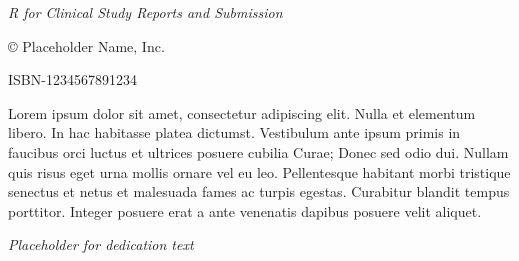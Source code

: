 \null\vfill
\begin{flushleft}
\thispagestyle{empty}
\textit{R for Clinical Study Reports and Submission}

© Placeholder Name, Inc.

ISBN-1234567891234

\noindent Lorem ipsum dolor sit amet, consectetur adipiscing elit.
Nulla et elementum libero. In hac habitasse platea dictumst.
Vestibulum ante ipsum primis in faucibus orci luctus et ultrices
posuere cubilia Curae; Donec sed odio dui. Nullam quis risus eget
urna mollis ornare vel eu leo. Pellentesque habitant morbi tristique
senectus et netus et malesuada fames ac turpis egestas.
Curabitur blandit tempus porttitor.
Integer posuere erat a ante venenatis dapibus posuere velit aliquet.
\end{flushleft}

\frontmatter

\begin{center}
    \thispagestyle{empty}
    \vspace*{\fill}
    \huge{\textit{Placeholder for dedication text}}
    \vspace*{\fill}
\end{center}

\mainmatter
